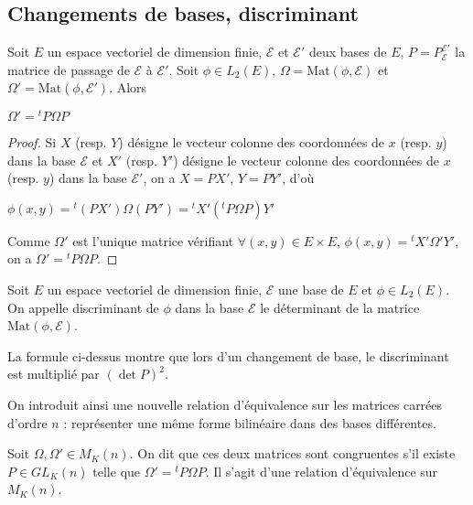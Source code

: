 \subsection{Changements de bases, discriminant}

\begin{thm}
Soit $E$ un espace vectoriel de dimension finie, $\mathcal{E}$ et $\mathcal{E}'$ deux bases de $E$, $P = P_\mathcal{E}^{\mathcal{E}'}$ la matrice de passage de $\mathcal{E}$ à $\mathcal{E}'$. Soit $\phi \in L_2(E)$, $\Omega = \mathrm{Mat}(\phi,\mathcal{E})$ et $\Omega' = \mathrm{Mat}(\phi,\mathcal{E}')$. Alors

$\Omega' = {}^t P \Omega P$
\end{thm}

\begin{proof}
Si $X$ (resp. $Y$) désigne le vecteur colonne des coordonnées de $x$ (resp. $y$) dans la base $\mathcal{E}$ et $X'$ (resp. $Y'$) désigne le vecteur colonne des coordonnées de $x$ (resp. $y$) dans la base $\mathcal{E}'$, on a $X = PX'$, $Y = PY'$, d'où

$\phi(x,y) = {}^t (PX') \Omega (PY') = {}^t X' ({}^t P \Omega P) Y'$

Comme $\Omega'$ est l'unique matrice vérifiant $\forall (x,y) \in E \times E$, $\phi(x,y) = {}^t X' \Omega' Y'$, on a $\Omega' = {}^t P \Omega P$.
\end{proof}

\begin{de}
Soit $E$ un espace vectoriel de dimension finie, $\mathcal{E}$ une base de $E$ et $\phi \in L_2(E)$. On appelle discriminant de $\phi$ dans la base $\mathcal{E}$ le déterminant de la matrice $\mathrm{Mat}(\phi,\mathcal{E})$.
\end{de}

\begin{rem}
La formule ci-dessus montre que lors d'un changement de base, le discriminant est multiplié par $(\det P)^2$.
\end{rem}

On introduit ainsi une nouvelle relation d'équivalence sur les matrices carrées d'ordre $n$ : représenter une même forme bilinéaire dans des bases différentes.

\begin{de}
Soit $\Omega,\Omega' \in M_K(n)$. On dit que ces deux matrices sont congruentes s'il existe $P \in GL_K(n)$ telle que $\Omega' = {}^t P \Omega P$. Il s'agit d'une relation d'équivalence sur $M_K(n)$.
\end{de}

